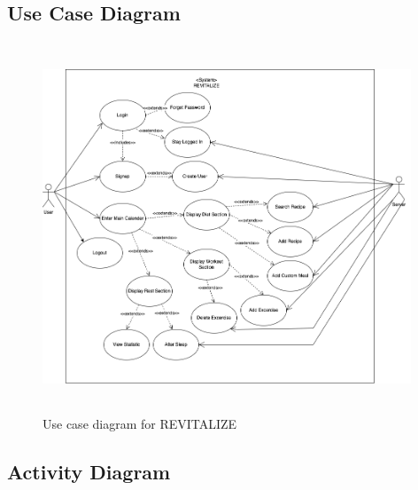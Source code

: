 \documentclass[12pt,letterpaper]{article}
\begin{document}
\subsection{Use Case Diagram}
\begin{figure}[H]
    \centering
    \includegraphics[width=11cm, height=11cm]{4G06SRSUseCaseDiagram.png}
    \caption{Use case diagram for REVITALIZE}
\end{figure}

\subsection{Activity Diagram}
\end{document}
